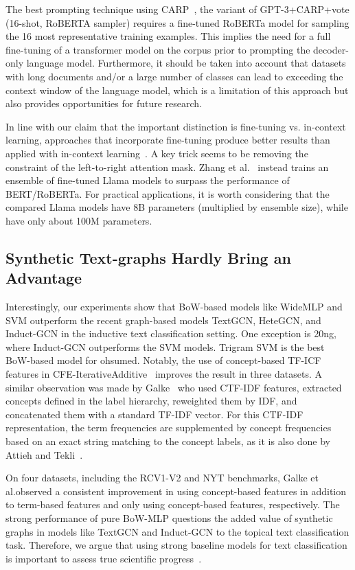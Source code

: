 The best prompting technique using CARP~\cite{carp}, \ie the variant of GPT-3+CARP+vote (16-shot, RoBERTA sampler)  requires a fine-tuned RoBERTa model for sampling the 16 most representative training examples.
This implies the need for a full fine-tuning of a transformer model on the corpus prior to prompting the decoder-only language model. 
Furthermore, it should be taken into account that datasets with long documents and/or a large number of classes can lead to exceeding the context window of the language model, which is a limitation of this approach but also provides opportunities for future research.

In line with our claim that the important distinction is fine-tuning vs. in-context learning, approaches that incorporate fine-tuning produce better results than \LLMs applied with in-context learning~\cite{li2023label,DBLP:journals/corr/abs-2402-07470-pushing-the-limit}. A key trick seems to be removing the constraint of the left-to-right attention mask. Zhang et al.~\cite{DBLP:journals/corr/abs-2402-07470-pushing-the-limit} instead trains an ensemble of fine-tuned Llama models to surpass the performance of BERT/RoBERTa.  For practical applications, it is worth considering that the compared Llama models have 8B parameters (multiplied by ensemble size), while \SLMs have only about 100M parameters.

\subsection{Synthetic Text-graphs Hardly Bring an Advantage}
Interestingly, our experiments show that BoW-based models like WideMLP and SVM outperform the recent graph-based models TextGCN, HeteGCN, and Induct-GCN in the inductive text classification setting.
One exception is 20ng, where Induct-GCN outperforms the SVM models.
Trigram SVM is the best BoW-based model for ohsumed.
Notably, the use of concept-based TF-ICF features in CFE-IterativeAdditive~\cite{ATTIEH2023110215} improves the result in three datasets. 
A similar observation was made by Galke~\etal\cite{DBLP:conf/kcap/GalkeMSBS17} who used CTF-IDF features, \ie extracted concepts defined in the label hierarchy, reweighted them by IDF, and concatenated them with a standard TF-IDF vector. 
For this CTF-IDF representation, the term frequencies are supplemented by concept frequencies based on an exact string matching to the concept labels, as it is also done by Attieh and Tekli~\cite{ATTIEH2023110215}.

On four datasets, including the RCV1-V2 and NYT benchmarks, Galke et al.\@ observed a consistent improvement in using concept-based features in addition to term-based features and only using concept-based features, respectively.
The strong performance of pure BoW-MLP questions the added value of synthetic graphs in models like TextGCN and Induct-GCN to the topical text classification task.
Therefore, we argue that using strong baseline models for text classification is important to assess true scientific progress~\cite{DBLP:conf/recsys/DacremaCJ19}.

